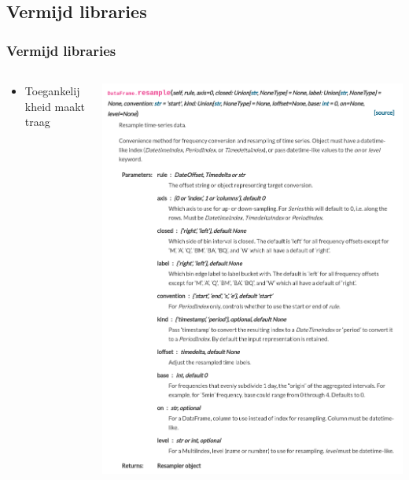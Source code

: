 \documentclass[aspectratio=169]{beamer}
\begin{document}
\subsection{Vermijd libraries}
\begin{frame}[fragile]
  \frametitle{Vermijd libraries}
  \begin{columns}
    \begin{column}{0.3\textwidth}
      \begin{itemize}
        \item Toegankelijkheid maakt traag
      \end{itemize}
    \end{column}
    \begin{column}{0.7\textwidth}
      \includegraphics[height=0.95\textheight]{img/resample.png}
    \end{column}
  \end{columns}
\end{frame}
\end{document}
